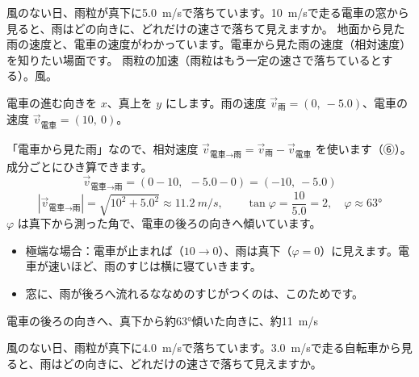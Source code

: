 \begin{phreidai}[電車の窓から見た雨]
\label{ph:力-1:ex11}風のない日、雨粒が真下に\qty{5.0}{m/s}で落ちています。\qty{10}{m/s}で走る電車の窓から見ると、雨はどの向きに、どれだけの速さで落ちて見えますか。
\phbamen
地面から見た雨の速度と、電車の速度がわかっています。電車から見た雨の速度（相対速度）を知りたい場面です。
\phmushi
雨粒の加速（雨粒はもう一定の速さで落ちているとする）。風。
\phzu
\noindent\begin{minipage}[c]{0.45\linewidth}\centering
{}
\end{minipage}\hfill
\begin{minipage}[c]{0.52\linewidth}
電車の進む向きを $x$、真上を $y$ にします。雨の速度 $\vec v_{\text{雨}}=(0,\ -5.0)$、電車の速度 $\vec v_{\text{電車}}=(10,\ 0)$。
\end{minipage}
\phriyu
「電車から見た雨」なので、相対速度 $\vec v_{\text{電車→雨}}=\vec v_{\text{雨}}-\vec v_{\text{電車}}$ を使います（⑥）。成分ごとにひき算できます。
\phtateru
\[ \vec v_{\text{電車→雨}}=(0-10,\ \ -5.0-0)=(-10,\ -5.0) \]
\phtoku
\[ |\vec v_{\text{電車→雨}}|=\sqrt{10^2+5.0^2}\approx\qty{11.2}{m/s},\qquad \tan\varphi=\frac{10}{5.0}=2,\quad \varphi\approx63° \]
$\varphi$ は真下から測った角で、電車の後ろの向きへ傾いています。
\phtashikame
\begin{itemize}[leftmargin=1.2\zw, itemsep=1pt, topsep=1pt, label={\color{bkTheme}●}]
\item 極端な場合：電車が止まれば（$10\to0$）、雨は真下（$\varphi=0$）に見えます。電車が速いほど、雨のすじは横に寝ていきます。
\item 窓に、雨が後ろへ流れるななめのすじがつくのは、このためです。
\end{itemize}
\kotae 電車の後ろの向きへ、真下から約63°傾いた向きに、約\qty{11}{m/s}
\end{phreidai}
\begin{jibun}
風のない日、雨粒が真下に\qty{4.0}{m/s}で落ちています。\qty{3.0}{m/s}で走る自転車から見ると、雨はどの向きに、どれだけの速さで落ちて見えますか。
\end{jibun}

